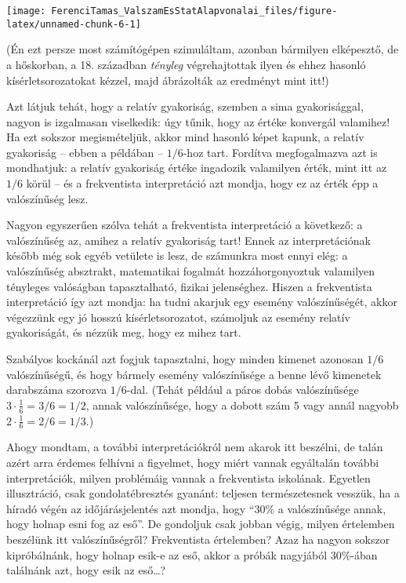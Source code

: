 \documentclass[magyar,]{book}
\begin{document}
\begin{center}\texttt{[image: FerenciTamas\_ValszamEsStatAlapvonalai\_files/figure-latex/unnamed-chunk-6-1]} \end{center}

(Én ezt persze most számítógépen szimuláltam, azonban bármilyen elképesztő, de a hőskorban, a 18. században \emph{tényleg} végrehajtottak ilyen és ehhez hasonló kísérletsorozatokat kézzel, majd ábrázolták az eredményt mint itt!)

Azt látjuk tehát, hogy a relatív gyakoriság, szemben a sima gyakorisággal, nagyon is izgalmasan viselkedik: úgy tűnik, hogy az értéke konvergál valamihez! Ha ezt sokszor megismételjük, akkor mind hasonló képet kapunk, a relatív gyakoriság -- ebben a példában -- \(1/6\)-hoz tart. Fordítva megfogalmazva azt is mondhatjuk: a relatív gyakoriság értéke ingadozik valamilyen érték, mint itt az \(1/6\) körül -- és a frekventista interpretáció azt mondja, hogy ez az érték épp a valószínűség lesz.

Nagyon egyszerűen szólva tehát a frekventista interpretáció a következő: a valószínűség az, amihez a relatív gyakoriság tart! Ennek az interpretációnak később még sok egyéb vetülete is lesz, de számunkra most ennyi elég: a valószínűség absztrakt, matematikai fogalmát hozzáhorgonyoztuk valamilyen tényleges valóságban tapasztalható, fizikai jelenséghez. Hiszen a frekventista interpretáció így azt mondja: ha tudni akarjuk egy esemény valószínűségét, akkor végezzünk egy jó hosszú kísérletsorozatot, számoljuk az esemény relatív gyakoriságát, és nézzük meg, hogy ez mihez tart.

Szabályos kockánál azt fogjuk tapasztalni, hogy minden kimenet azonosan \(1/6\) valószínűségű, és hogy bármely esemény valószínűsége a benne lévő kimenetek darabszáma szorozva \(1/6\)-dal. (Tehát például a páros dobás valószínűsége \(3 \cdot\frac{1}{6}=3/6=1/2\), annak valószínűsége, hogy a dobott szám 5 vagy annál nagyobb \(2 \cdot\frac{1}{6}=2/6=1/3\).)

Ahogy mondtam, a további interpretációkról nem akarok itt beszélni, de talán azért arra érdemes felhívni a figyelmet, hogy miért vannak egyáltalán további interpretációk, milyen problémáig vannak a frekventista iskolának. Egyetlen illusztráció, csak gondolatébresztés gyanánt: teljesen természetesnek vesszük, ha a híradó végén az időjárásjelentés azt mondja, hogy \enquote{30\% a valószínűsége annak, hogy holnap esni fog az eső}. De gondoljuk csak jobban végig, milyen értelemben beszélünk itt valószínűségről? Frekventista értelemben? Azaz ha nagyon sokszor kipróbálnánk, hogy holnap esik-e az eső, akkor a próbák nagyjából 30\%-ában találnánk azt, hogy esik az eső\ldots?
\end{document}
